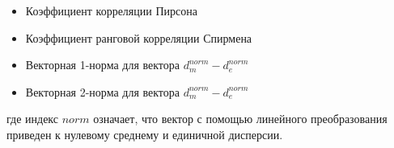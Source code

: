 \begin{itemize}
\item Коэффициент корреляции Пирсона
\item Коэффициент ранговой корреляции Спирмена
\item Векторная 1-норма для вектора $d_{m}^{norm} - d_{e}^{norm}$
\item Векторная 2-норма для вектора $d_{m}^{norm} - d_{e}^{norm}$
\end{itemize} 

где индекс $norm$ означает, что вектор с помощью линейного преобразования приведен к нулевому среднему и единичной дисперсии.


\clearpage
